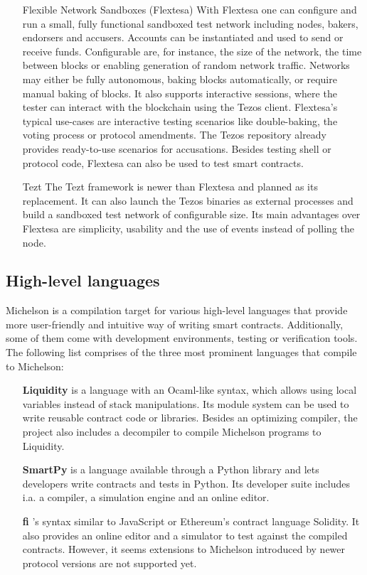 \begin{itemize}
\item[Flexible Network Sandboxes (Flextesa)] With Flextesa one can configure and run a small, fully functional sandboxed test network including nodes, bakers, endorsers and accusers. Accounts can be instantiated and used to send or receive funds. Configurable are, for instance, the size of the network, the time between blocks or enabling generation of random network traffic. Networks may either be fully autonomous, baking blocks automatically, or require manual baking of blocks. It also supports interactive sessions, where the tester can interact with the blockchain using the Tezos client. Flextesa's typical use-cases are interactive testing scenarios like double-baking, the voting process or protocol amendments. The Tezos repository already provides ready-to-use scenarios for accusations. Besides testing shell or protocol code, Flextesa can also be used to test smart contracts.\cite{tezos docs}
\item[Tezt] The Tezt framework is newer than Flextesa and planned as its replacement. It can also launch the Tezos binaries as external processes and build a sandboxed test network of configurable size. Its main advantages over Flextesa are simplicity, usability and the use of events instead of polling the node.\cite{tezos_docs_tezt}
\end{itemize}

\subsection{High-level languages}
Michelson is a compilation target for various high-level languages that provide more user-friendly and intuitive way of writing smart contracts. Additionally, some of them come with development environments, testing or verification tools. The following list comprises of the three most prominent languages that compile to Michelson:

\begin{itemize}
\item[\textbf{Liquidity}] is a language with an Ocaml-like syntax, which allows using local variables instead of stack manipulations. Its module system can be used to write reusable contract code or libraries. Besides an optimizing compiler, the project also includes a decompiler to compile Michelson programs to Liquidity. \cite{liquidity}
\item[\textbf{SmartPy}] is a language available through a Python library and lets developers write contracts and tests in Python. Its developer suite includes i.a. a compiler, a simulation engine and an online editor. \cite{smartpy}
\item [\textbf{fi}] 's syntax similar to JavaScript or Ethereum's contract language Solidity. It also provides an online editor and a simulator to test against the compiled contracts. However, it seems extensions to Michelson introduced by newer protocol versions are not supported yet. \cite{https://fi-code.com/}
\end{itemize}